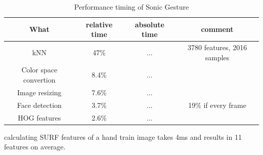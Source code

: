 \begin{table}
\centering
\begin{tabular}{cccc}
What & relative time & absolute time & comment \\
\hline
kNN & 47\% & ... & 3780 features, 2016 samples \\
Color space convertion & 8.4\% & ... & \\
Image resizing & 7.6\% & ... & \\
Face detection & 3.7\% & ... &  19\% if every frame \\
HOG features & 2.6\% & ... \\
\end{tabular}
\caption{Performance timing of Sonic Gesture}
\end{table}

calculating SURF features of a hand train image takes 4ms and results in 11 features on average.